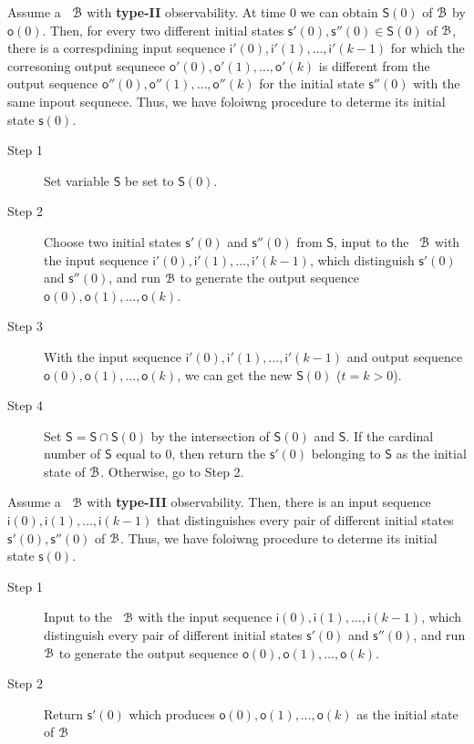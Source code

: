  Assume a \BCN\ ${\mathcal{B}}$  with {\bf type-II}  observability. At time $0$ we can  obtain $\mathsf{S}(0)$ of ${\mathcal{B}}$ by $\mathsf{o}(0)$. Then, for every two different initial states $\mathsf{s}'(0), \mathsf{s}''(0)\in \mathsf{S}(0)$ of ${\mathcal{B}}$, there is a correspdining input sequence $\mathsf{i}'(0),\mathsf{i}'(1),\ldots, \mathsf{i}'(k-1)$ for which the corresoning output sequnece $\mathsf{o}'(0),\mathsf{o}'(1),\ldots,\mathsf{o}'(k)$ is different from the output sequence $\mathsf{o}''(0),\mathsf{o}''(1),\ldots,\mathsf{o}''(k)$ for the initial state $\mathsf{s}''(0)$ with the same inpout sequnece. Thus, we have foloiwng procedure to determe its initial state $\mathsf{s}(0)$.
\begin{description}
	\item[Step 1]  Set variable $\mathsf{S}$ be set to $\mathsf{S}(0)$.
	\item[Step 2] Choose two initial states $\mathsf{s}'(0)$ and $\mathsf{s}''(0)$ from $\mathsf{S}$, input to the \BCN\ ${\mathcal{B}}$ with the input sequence $\mathsf{i}'(0),\mathsf{i}'(1),\ldots, \mathsf{i}'(k-1)$, which distinguish $\mathsf{s}'(0)$ and $\mathsf{s}''(0)$, and run ${\mathcal{B}}$ to generate the output sequence $\mathsf{o}(0),\mathsf{o}(1),\ldots,\mathsf{o}(k)$.
	\item[Step 3] With the input sequence $\mathsf{i}'(0),\mathsf{i}'(1),\ldots, \mathsf{i}'(k-1)$ and output sequence $\mathsf{o}(0),\mathsf{o}(1),\ldots,\mathsf{o}(k)$, we can get the new $\mathsf{S}(0)$ ($t=k>0$).
	\item[Step 4] Set $\mathsf{S}=\mathsf{S}\cap\mathsf{S}(0)$ by the intersection of $\mathsf{S}(0)$ and $\mathsf{S}$. If the cardinal number of $\mathsf{S}$ equal to $0$, then return the $\mathsf{s}'(0)$ belonging to $\mathsf{S}$ as the initial state of ${\mathcal{B}}$. Otherwise, go to Step 2.
\end{description}

Assume a \BCN\ ${\mathcal{B}}$  with {\bf type-III}  observability. Then, there is an input sequence $\mathsf{i}(0),\mathsf{i}(1),\ldots, \mathsf{i}(k-1)$ that distinguishes every pair of different initial states $\mathsf{s}'(0), \mathsf{s}''(0)$ of ${\mathcal{B}}$. Thus, we have foloiwng procedure to determe its initial state $\mathsf{s}(0)$.

 \begin{description}
	\item[Step 1]  Input to the \BCN\ ${\mathcal{B}}$ with the input sequence $\mathsf{i}(0),\mathsf{i}(1),\ldots, \mathsf{i}(k-1)$, which distinguish every pair of different initial states $\mathsf{s}'(0)$ and $\mathsf{s}''(0)$, and run ${\mathcal{B}}$ to generate the output sequence $\mathsf{o}(0),\mathsf{o}(1),\ldots,\mathsf{o}(k)$.
	\item[Step 2] Return $\mathsf{s}'(0)$ which produces $\mathsf{o}(0),\mathsf{o}(1),\ldots,\mathsf{o}(k)$ as the initial state of ${\mathcal{B}}$ 
\end{description}

